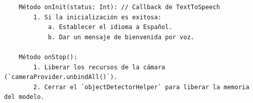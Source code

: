 \documentclass[10pt,a4paper]{report}
\begin{document}
\begin{verbatim}
    Método onInit(status: Int): // Callback de TextToSpeech
        1. Si la inicialización es exitosa:
            a. Establecer el idioma a Español.
            b. Dar un mensaje de bienvenida por voz.

    Método onStop():
        1. Liberar los recursos de la cámara (`cameraProvider.unbindAll()`).
        2. Cerrar el `objectDetectorHelper` para liberar la memoria del modelo.

\end{verbatim}
\end{document}

